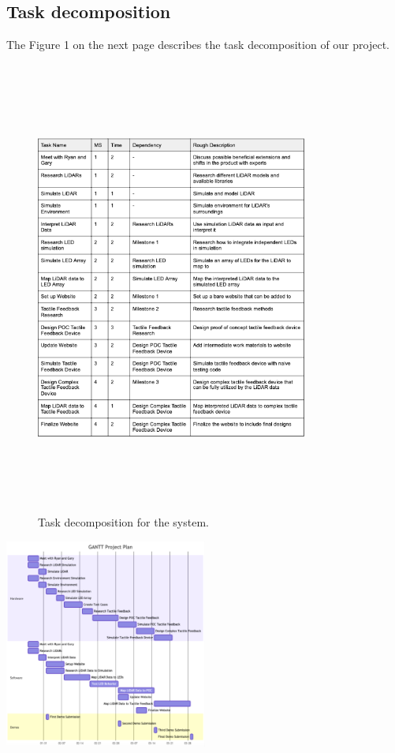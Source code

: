 \documentclass{article}
\begin{document}
\subsection{Task decomposition} 
The Figure 1 on the next page describes the task decomposition of our project.

\begin{figure}[h]
\begin{center}
  \includegraphics[width=0.8\textwidth,height=15cm]{decomposition.png}
  \caption{Task decomposition for the system.}
  \end{center}
\end{figure}


\begin{center}
    \includegraphics [width=0.5\textwidth]{Gantt PP.png}
\end{center}
\end{document}
